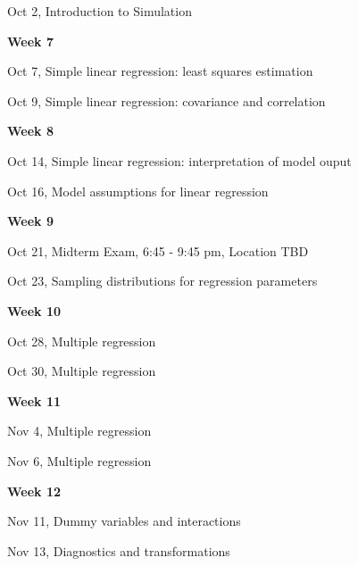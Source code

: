 \documentclass[11pt]{article}
\begin{document}
	Oct 2, %
	Introduction to Simulation
	
	
	
	
		
\vspace{2mm}\noindent\textbf{Week 7} 


{ Oct 7, Simple linear regression: least squares estimation}

Oct 9, Simple linear regression: covariance and correlation

%	

	
	
\vspace{2mm}\noindent\textbf{Week 8}

Oct 14, 
Simple linear regression: interpretation of model ouput

	
	Oct 16, Model assumptions for linear regression
	
	
\vspace{2mm}\noindent\textbf{Week 9}

{\color{UTAustin}
	Oct 21, Midterm Exam, 6:45 - 9:45 pm, Location TBD
}

	Oct 23, Sampling distributions for regression parameters
	
		
\vspace{2mm}\noindent\textbf{Week 10}

		
	Oct 28,  Multiple regression
	
	Oct 30, Multiple regression

\vspace{2mm}\noindent\textbf{Week 11}

	
	
	Nov 4,  Multiple regression %
	
	Nov 6, Multiple regression
	
\vspace{2mm}\noindent\textbf{Week 12} 

	
	{ Nov 11, Dummy variables and interactions } %
	
	Nov 13, Diagnostics and transformations %
	
\end{document}
